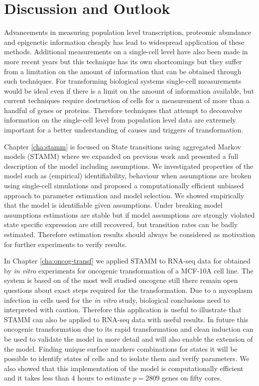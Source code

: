 \chapter{Discussion and Outlook}
\label{cha:discussion-outlook}

Advancements in measuring population level transcription, proteomic abundance and epigenetic information cheaply has lead to widespread application of these methods. Additional measurements on a single-cell level have also been made in more recent years \citep{Wheeler:2003ka, Dalerba:2011cc, Wang:2010ew} but this technique has its own shortcomings but they suffer from a limitation on the amount of information that can be obtained through such techniques. For transforming biological systems single-cell measurements would be ideal even if there is a limit on the amount of information available, but current techniques require destruction of cells for a measurement of more than a handful of genes or proteins. Therefore techniques that attempt to deconvolve information on the single-cell level from population level data are extremely important for a better understanding of causes and triggers of transformation. 

Chapter \ref{cha:stamm} is focused on State transitions using aggregated Markov models (STAMM) where we expanded on previous work \citep{Armond:2013} and presented a full description of the model including assumptions. We investigated properties of the model such as (empirical) identifiability, behaviour when assumptions are broken using single-cell simulations and proposed a computationally efficient unbiased approach to parameter estimation and model selection. We showed empirically that the model is identifiable given assumptions. Under breaking model assumptions estimations are stable but if model assumptions are strongly violated state specific expression are still recovered, but transition rates can be badly estimated. Therefore estimation results should always be considered as motivation for further experiments to verify results.

In Chapter \ref{cha:oncog-transf} we applied STAMM to RNA-seq data for obtained by {\it in vitro} experiments for oncogenic transformation of a MCF-10A cell line. The system is based on of the most well studied oncogene still there remain open questions about exact steps required for the transformation. Due to a mycoplasm infection in  cells used for the {\it in vitro} study, biological conclusions need to interpreted with caution. Therefore this application is useful to illustrate that STAMM can also be applied to RNA-seq data with useful results. In future this oncogenic transformation due to its rapid transformation and clean induction can be used to validate the model in more detail and will also enable the extension of the model. Finding unique surface markers combinations for states it will be possible to identify states of cells and to isolate them and verify parameters. We also showed that this implementation of the model is computationally efficient and it takes less than $4$ hours to estimate $p=2809$ genes on fifty cores. 

